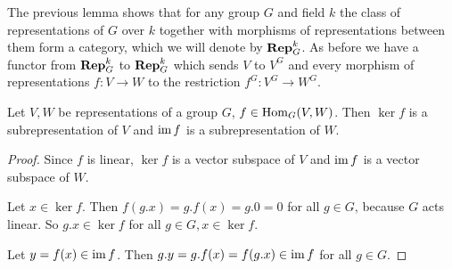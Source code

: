 The previous lemma shows that for any group $G$ and field $k$ the class of representations of $G$ over $k$ together with morphisms of representations between them form a category, which we will denote by $\mathbf{Rep}^k_G$.
As before we have a functor from $\mathbf{Rep}^k_G$ to $\mathbf{Rep}^k_G$ which sends $V$ to $V^G$ and every morphism of representations $f \colon V \to W$ to the restriction $f^G \colon V^G \to W^G$.


\begin{lemma}\label{lemma: ker and im subrepresentations}
  Let $V,W$ be representations of a group $G$, $f \in \operatorname{Hom}_G(V,W)$.
  Then $\ker f$ is a subrepresentation of $V$ and $\operatorname{im} f$ is a subrepresentation of $W$.
\end{lemma}
\begin{proof}
  Since $f$ is linear, $\ker f$ is a vector subspace of $V$ and $\operatorname{im} f$ is a vector subspace of $W$.
  
  Let $x \in \ker f$.
  Then $f(g.x) = g.f(x) = g.0 = 0$ for all $g \in G$, because $G$ acts linear.
  So $g.x \in \ker f$ for all $g \in G, x \in \ker f$.
  
  Let $y = f(x) \in \operatorname{im} f$.
  Then $g.y = g.f(x) = f(g.x) \in \operatorname{im} f$ for all $g \in G$.
\end{proof}


